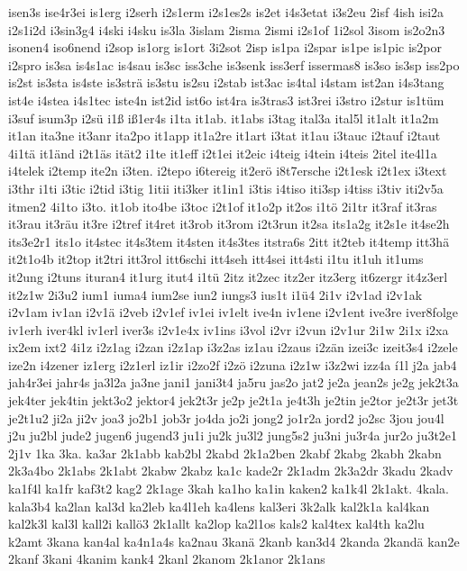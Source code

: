 {isen3s
ise4r3ei
is1erg
i2serh
i2s1erm
i2s1es2s
is2et
i4s3etat
i3s2eu
2isf
4ish
isi2a
i2s1i2d
i3sin3g4
i4ski
i4sku
is3la
3islam
2isma
2ismi
i2s1of
1i2sol
3isom
is2o2n3
isonen4
iso6nend
i2sop
is1org
is1ort
3i2sot
2isp
is1pa
i2spar
is1pe
is1pic
is2por
i2spro
is3sa
is4s1ac
is4sau
is3sc
iss3che
is3senk
iss3erf
issermas8
is3so
is3sp
iss2po
is2st
is3sta
is4ste
is3strä
is3stu
is2su
i2stab
ist3ac
is4tal
i4stam
ist2an
i4s3tang
ist4e
i4stea
i4s1tec
iste4n
ist2id
ist6o
ist4ra
is3tras3
ist3rei
i3stro
i2stur
is1tüm
i3suf
isum3p
i2sü
i1ß
iß1er4s
i1ta
it1ab.
it1abs
i3tag
ital3a
ital5l
it1alt
it1a2m
it1an
ita3ne
it3anr
ita2po
it1app
it1a2re
it1art
i3tat
it1au
i3tauc
i2tauf
i2taut
4i1tä
it1änd
i2t1äs
ität2
i1te
it1eff
i2t1ei
it2eic
i4teig
i4tein
i4teis
2itel
ite4l1a
i4telek
i2temp
ite2n
i3ten.
i2tepo
i6tereig
it2erö
i8t7ersche
i2t1esk
i2t1ex
i3text
i3thr
i1ti
i3tic
i2tid
i3tig
1itii
iti3ker
it1in1
i3tis
i4tiso
iti3sp
i4tiss
i3tiv
iti2v5a
itmen2
4i1to
i3to.
it1ob
ito4be
i3toc
i2t1of
it1o2p
it2os
i1tö
2i1tr
it3raf
it3ras
it3rau
it3räu
it3re
i2tref
it4ret
it3rob
it3rom
i2t3run
it2sa
its1a2g
it2s1e
it4se2h
its3e2r1
its1o
it4stec
it4s3tem
it4sten
it4s3tes
itstra6s
2itt
it2teb
it4temp
itt3hä
it2t1o4b
it2top
it2tri
itt3rol
itt6schi
itt4seh
itt4sei
itt4sti
i1tu
it1uh
it1ums
it2ung
i2tuns
ituran4
it1urg
itut4
i1tü
2itz
it2zec
itz2er
itz3erg
it6zergr
it4z3erl
it2z1w
2i3u2
ium1
iuma4
ium2se
iun2
iungs3
ius1t
i1ü4
2i1v
i2v1ad
i2v1ak
i2v1am
iv1an
i2v1ä
i2veb
i2v1ef
iv1ei
iv1elt
ive4n
iv1ene
i2v1ent
ive3re
iver8folge
iv1erh
iver4kl
iv1erl
iver3s
i2v1e4x
iv1ins
i3vol
i2vr
i2vun
i2v1ur
2i1w
2i1x
i2xa
ix2em
ixt2
4i1z
i2z1ag
i2zan
i2z1ap
i3z2as
iz1au
i2zaus
i2zän
izei3c
izeit3s4
i2zele
ize2n
i4zener
iz1erg
i2z1erl
iz1ir
i2zo2f
i2zö
i2zuna
i2z1w
i3z2wi
izz4a
í1l
j2a
jab4
jah4r3ei
jahr4s
ja3l2a
ja3ne
jani1
jani3t4
ja5ru
jas2o
jat2
je2a
jean2s
je2g
jek2t3a
jek4ter
jek4tin
jekt3o2
jektor4
jek2t3r
je2p
je2t1a
je4t3h
je2tin
je2tor
je2t3r
jet3t
je2t1u2
ji2a
ji2v
joa3
jo2b1
job3r
jo4da
jo2i
jong2
jo1r2a
jord2
jo2sc
3jou
jou4l
j2u
ju2bl
jude2
jugen6
jugend3
ju1i
ju2k
ju3l2
jung5s2
ju3ni
ju3r4a
jur2o
ju3t2e1
2j1v
1ka
3ka.
ka3ar
2k1abb
kab2bl
2kabd
2k1a2ben
2kabf
2kabg
2kabh
2kabn
2k3a4bo
2k1abs
2k1abt
2kabw
2kabz
ka1c
kade2r
2k1adm
2k3a2dr
3kadu
2kadv
ka1f4l
ka1fr
kaf3t2
kag2
2k1age
3kah
ka1ho
ka1in
kaken2
ka1k4l
2k1akt.
4kala.
kala3b4
ka2lan
kal3d
ka2leb
ka4l1eh
ka4lens
kal3eri
3k2alk
kal2k1a
kal4kan
kal2k3l
kal3l
kall2i
kallö3
2k1allt
ka2lop
ka2l1os
kals2
kal4tex
kal4th
ka2lu
k2amt
3kana
kan4al
ka4n1a4s
ka2nau
3kanä
2kanb
kan3d4
2kanda
2kandä
kan2e
2kanf
3kani
4kanim
kank4
2kanl
2kanom
2k1anor
2k1ans
}

